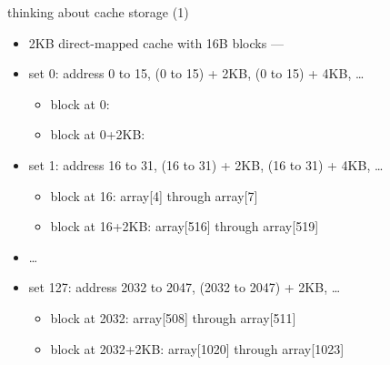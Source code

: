 \begin{frame}[fragile,label=thinkStorage1]{thinking about cache storage (1)}
    \begin{itemize}
    \item 2KB direct-mapped cache with 16B blocks ---
    \item set 0: address 0 to 15, (0 to 15) + 2KB, (0 to 15) + 4KB, \ldots
        \begin{itemize}
        \item<3-> block at 0: 
        \item<4-> block at 0+2KB: 
        \end{itemize}
    \item set 1: address 16 to 31, (16 to 31) + 2KB, (16 to 31) + 4KB, \ldots \\
        \begin{itemize}
        \item<3-> block at 16: array[4] through array[7]
        \item<4-> block at 16+2KB: array[516] through array[519]
        \end{itemize}
    \item \ldots
    \item set 127: address 2032 to 2047, (2032 to 2047) + 2KB, \ldots
        \begin{itemize}
        \item<3-> block at 2032: array[508] through array[511]
        \item<4-> block at 2032+2KB: array[1020] through array[1023]
        \end{itemize}
    \end{itemize}
\end{frame}

